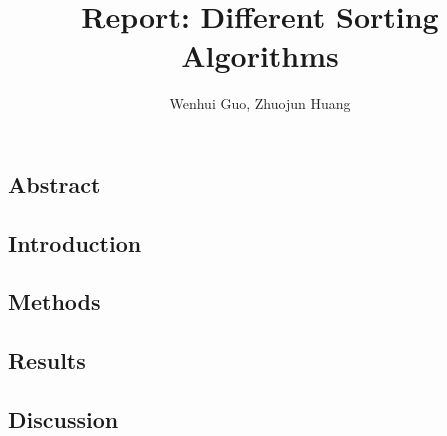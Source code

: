 \documentclass{article}
\begin{document}
\title{Report: Different Sorting Algorithms}
\author{Wenhui Guo, Zhuojun Huang}
\maketitle


\subsection*{Abstract}

\subsection*{Introduction}


\subsection*{Methods}

\subsection*{Results}

\subsection*{Discussion}
\end{document}
